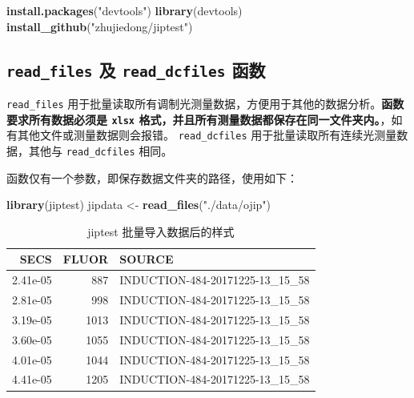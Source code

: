 \documentclass[]{krantz}
\makeatletter
\newenvironment{Shaded}{\begin{snugshade}}{\end{snugshade}}
\newcommand{\KeywordTok}[1]{\textcolor[rgb]{0.13,0.29,0.53}{\textbf{#1}}}
\newcommand{\StringTok}[1]{\textcolor[rgb]{0.31,0.60,0.02}{#1}}
\newcommand{\NormalTok}[1]{#1}
\newenvironment{kframe}{%
\medskip{}
\setlength{\fboxsep}{.8em}
 \def\at@end@of@kframe{}%
 \ifinner\ifhmode%
  \def\at@end@of@kframe{\end{minipage}}%
  \begin{minipage}{\columnwidth}%
 \fi\fi%
 \def\FrameCommand##1{\hskip\@totalleftmargin \hskip-\fboxsep
 \colorbox{shadecolor}{##1}\hskip-\fboxsep
     \hskip-\linewidth \hskip-\@totalleftmargin \hskip\columnwidth}%
 \MakeFramed {\advance\hsize-\width
   \@totalleftmargin\z@ \linewidth\hsize
   \@setminipage}}%
 {\par\unskip\endMakeFramed%
 \at@end@of@kframe}
\renewenvironment{Shaded}{\begin{kframe}}{\end{kframe}}
\theoremstyle{definition}
\theoremstyle{definition}
\theoremstyle{definition}
\theoremstyle{remark}
\makeatother
\begin{document}
\begin{Shaded}
\begin{Highlighting}[]
\KeywordTok{install.packages}\NormalTok{(}\StringTok{"devtools"}\NormalTok{)}
\KeywordTok{library}\NormalTok{(devtools)}
\KeywordTok{install_github}\NormalTok{(}\StringTok{"zhujiedong/jiptest"}\NormalTok{)}
\end{Highlighting}
\end{Shaded}

\subsection{\texorpdfstring{\texttt{read\_files} 及
\texttt{read\_dcfiles}
函数}{read\_files 及 read\_dcfiles 函数}}\label{readfluor}

\texttt{read\_files}
用于批量读取所有调制光测量数据，方便用于其他的数据分析。\textbf{函数要求所有数据必须是
\texttt{xlsx}
格式，并且所有测量数据都保存在同一文件夹内。}，如有其他文件或测量数据则会报错。
\texttt{read\_dcfiles} 用于批量读取所有连续光测量数据，其他与
\texttt{read\_dcfiles} 相同。

函数仅有一个参数，即保存数据文件夹的路径，使用如下：

\begin{Shaded}
\begin{Highlighting}[]
\KeywordTok{library}\NormalTok{(jiptest)}
\NormalTok{jipdata <-}\StringTok{ }\KeywordTok{read_files}\NormalTok{(}\StringTok{"./data/ojip"}\NormalTok{)}
\end{Highlighting}
\end{Shaded}

\begin{table}

\caption{\label{tab:unnamed-chunk-30}jiptest 批量导入数据后的样式}
\centering
\begin{tabular}[t]{rrl}
\toprule
SECS & FLUOR & SOURCE\\
\midrule
2.41e-05 & 887 & INDUCTION-484-20171225-13\_15\_58\\
2.81e-05 & 998 & INDUCTION-484-20171225-13\_15\_58\\
3.19e-05 & 1013 & INDUCTION-484-20171225-13\_15\_58\\
3.60e-05 & 1055 & INDUCTION-484-20171225-13\_15\_58\\
4.01e-05 & 1044 & INDUCTION-484-20171225-13\_15\_58\\
4.41e-05 & 1205 & INDUCTION-484-20171225-13\_15\_58\\
\bottomrule
\end{tabular}
\end{table}
\end{document}
